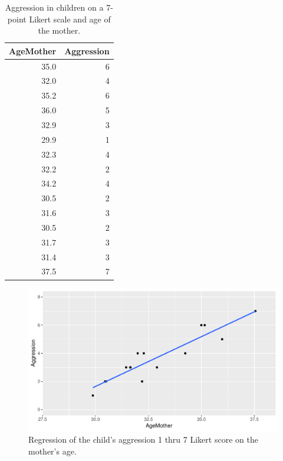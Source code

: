 \documentclass[]{book}\usepackage[]{graphicx}\usepackage[]{color}
\makeatletter
\def\maxwidth{ %
  \ifdim\Gin@nat@width>\linewidth
    \linewidth
  \else
    \Gin@nat@width
  \fi
}
\newenvironment{knitrout}{}{} %
\makeatother
\begin{document}
\begin{table}[ht]
\centering
\caption{Aggression in children on a 7-point Likert scale and age of the mother.} 
\label{tab:nonpar_2}
\begin{tabular}{rr}
  \hline
AgeMother & Aggression \\ 
  \hline
35.0 & 6 \\ 
  32.0 & 4 \\ 
  35.2 & 6 \\ 
  36.0 & 5 \\ 
  32.9 & 3 \\ 
  29.9 & 1 \\ 
  32.3 & 4 \\ 
  32.2 & 2 \\ 
  34.2 & 4 \\ 
  30.5 & 2 \\ 
  31.6 & 3 \\ 
  30.5 & 2 \\ 
  31.7 & 3 \\ 
  31.4 & 3 \\ 
  37.5 & 7 \\ 
   \hline
\end{tabular}
\end{table}



\begin{knitrout}
\color{fgcolor}\begin{figure}

{\centering \includegraphics[width=\maxwidth]{figure/fig1121-1} 

}

\caption[Regression of the child's aggression 1 thru 7 Likert score on the mother's age]{Regression of the child's aggression 1 thru 7 Likert score on the mother's age.}\label{fig:fig1121}
\end{figure}


\end{knitrout}
\end{document}
